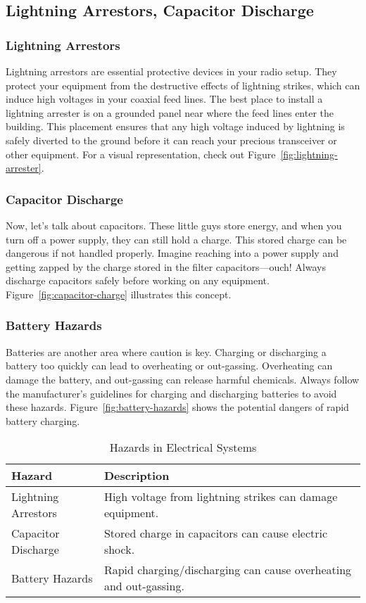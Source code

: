 \subsection{Lightning Arrestors, Capacitor Discharge}
\label{subsec:lightning-cap}

\subsubsection*{Lightning Arrestors}
Lightning arrestors are essential protective devices in your radio setup. They protect your equipment from the destructive effects of lightning strikes, which can induce high voltages in your coaxial feed lines. The best place to install a lightning arrester is on a grounded panel near where the feed lines enter the building. This placement ensures that any high voltage induced by lightning is safely diverted to the ground before it can reach your precious transceiver or other equipment. For a visual representation, check out Figure~\ref{fig:lightning-arrester}.

\subsubsection*{Capacitor Discharge}
Now, let's talk about capacitors. These little guys store energy, and when you turn off a power supply, they can still hold a charge. This stored charge can be dangerous if not handled properly. Imagine reaching into a power supply and getting zapped by the charge stored in the filter capacitors—ouch! Always discharge capacitors safely before working on any equipment. Figure~\ref{fig:capacitor-charge} illustrates this concept.

\subsubsection*{Battery Hazards}
Batteries are another area where caution is key. Charging or discharging a battery too quickly can lead to overheating or out-gassing. Overheating can damage the battery, and out-gassing can release harmful chemicals. Always follow the manufacturer's guidelines for charging and discharging batteries to avoid these hazards. Figure~\ref{fig:battery-hazards} shows the potential dangers of rapid battery charging.

\begin{table}[h]
    \centering
    \caption{Hazards in Electrical Systems}
    \label{tab:electrical-hazards}
    \begin{tabular}{|l|l|}
        \hline
        \textbf{Hazard} & \textbf{Description} \\
        \hline
        Lightning Arrestors & High voltage from lightning strikes can damage equipment. \\
        Capacitor Discharge & Stored charge in capacitors can cause electric shock. \\
        Battery Hazards & Rapid charging/discharging can cause overheating and out-gassing. \\
        \hline
    \end{tabular}
\end{table}

